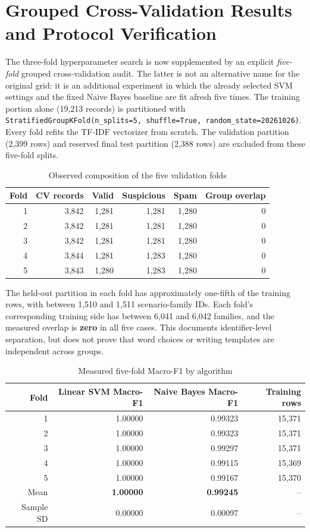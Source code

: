 \section{Grouped Cross-Validation Results and Protocol Verification}
The three-fold hyperparameter search is now supplemented by an explicit \emph{five-fold} grouped cross-validation audit. The latter is not an alternative name for the original grid: it is an additional experiment in which the already selected SVM settings and the fixed Naive Bayes baseline are fit afresh five times. The training portion alone (19,213 records) is partitioned with \texttt{StratifiedGroupKFold(n\_splits=5, shuffle=True, random\_state=20261026)}. Every fold refits the TF-IDF vectorizer from scratch. The validation partition (2,399 rows) and reserved final test partition (2,388 rows) are excluded from these five-fold splits.

\begin{table}[H]\centering\caption{Observed composition of the five validation folds}\label{tab:fold-audit}\small\begin{tabular}{rrrrrr}\toprule
Fold & CV records & Valid & Suspicious & Spam & Group overlap\\\midrule
1 & 3,842 & 1,281 & 1,281 & 1,280 & 0\\
2 & 3,842 & 1,281 & 1,281 & 1,280 & 0\\
3 & 3,842 & 1,281 & 1,281 & 1,280 & 0\\
4 & 3,844 & 1,281 & 1,283 & 1,280 & 0\\
5 & 3,843 & 1,280 & 1,283 & 1,280 & 0\\\bottomrule
\end{tabular}\end{table}
The held-out partition in each fold has approximately one-fifth of the training rows, with between 1,510 and 1,511 scenario-family IDs. Each fold's corresponding training side has between 6,041 and 6,042 families, and the measured overlap is \textbf{zero} in all five cases. This documents identifier-level separation, but does not prove that word choices or writing templates are independent across groups.

\begin{table}[H]\centering\caption{Measured five-fold Macro-F1 by algorithm}\label{tab:fivefold}\small\begin{tabular}{rrrr}\toprule
Fold & Linear SVM Macro-F1 & Naive Bayes Macro-F1 & Training rows\\\midrule
1 & 1.00000 & 0.99323 & 15,371\\
2 & 1.00000 & 0.99323 & 15,371\\
3 & 1.00000 & 0.99297 & 15,371\\
4 & 1.00000 & 0.99115 & 15,369\\
5 & 1.00000 & 0.99167 & 15,370\\\midrule
Mean & \textbf{1.00000} & \textbf{0.99245} & --\\
Sample SD & 0.00000 & 0.00097 & --\\\bottomrule
\end{tabular}\end{table}

